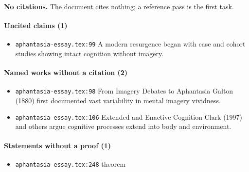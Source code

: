 \documentclass[11pt]{article}
\newcommand{\loc}[1]{{\small\color{muted}\texttt{#1}}}
\begin{document}
\textbf{No citations.} The document cites nothing; a reference pass is the first task.

\paragraph{Uncited claims (1)}
\begin{itemize}
\item \loc{aphantasia-essay.tex:99} A modern resurgence began with case and cohort studies showing intact cognition without imagery.
\end{itemize}
\paragraph{Named works without a citation (2)}
\begin{itemize}
\item \loc{aphantasia-essay.tex:98} From Imagery Debates to Aphantasia Galton (1880) first documented vast variability in mental imagery vividness.
\item \loc{aphantasia-essay.tex:106} Extended and Enactive Cognition Clark (1997) and others argue cognitive processes extend into body and environment.
\end{itemize}
\paragraph{Statements without a proof (1)}
\begin{itemize}
\item \loc{aphantasia-essay.tex:248} theorem
\end{itemize}
\end{document}
